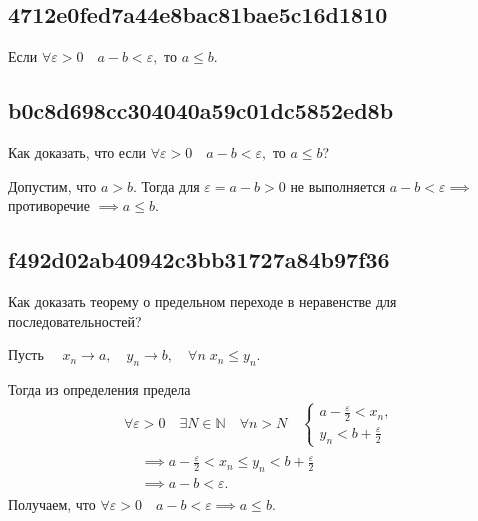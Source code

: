 \documentclass[11pt, a5paper]{article}
\newenvironment{note}[1]{\goodbreak\par\subsection{\hfill \color{lightgray}\tiny #1}}{}
\newenvironment{cloze}[2][\ldots]{\begin{leftbar}}{\end{leftbar}}
\newenvironment{icloze}[2][\ldots]{%
  \ignorespaces\text{\tiny \color{lightgray} \{\{c#2:: }%
}{%
  \text{\tiny \color{lightgray}\}\}}\unskip%
}
\begin{document}
    \begin{note}{4712e0fed7a44e8bac81bae5c16d1810}
        Если \( \forall \varepsilon > 0 \quad a - b < \varepsilon, \) то
        \begin{icloze}{1}\( a \leqslant b. \)\end{icloze}
    \end{note}

    \begin{note}{b0c8d698cc304040a59c01dc5852ed8b}
        Как доказать, что если \( \forall \varepsilon > 0 \quad a - b <
        \varepsilon, \) то \( a \leqslant b \)?

        \begin{cloze}{1}
            Допустим, что \( a > b. \) Тогда для \( \varepsilon = a - b > 0 \)
            не выполняется \( a - b < \varepsilon \implies  \) противоречие \(
            \implies a \leqslant b. \)
        \end{cloze}
    \end{note}

    \begin{note}{f492d02ab40942c3bb31727a84b97f36}
        Как доказать теорему о предельном переходе в неравенстве для
        последовательностей?

        \begin{cloze}{1}
            Пусть \( \quad x_n \to a, \quad y_n \to b, \quad \forall n\; x_n
            \leqslant y_n. \)

            Тогда из определения предела \[
                \begin{gathered}
                    \forall \varepsilon > 0 \quad \exists N \in \mathbb N \quad
                    \forall n > N \quad \begin{cases}
                        a - \frac{\varepsilon}{2} < x_n, \\
                        y_n < b + \frac{\varepsilon}{2}
                    \end{cases} \\
                    \begin{aligned}
                        &\implies a - \frac{\varepsilon}{2} < x_n \leqslant y_n < b + \frac{\varepsilon}{2} \\
                        &\implies a - b < \varepsilon.
                    \end{aligned}
                \end{gathered}
            \]
            Получаем, что \( \forall \varepsilon > 0 \quad a - b < \varepsilon
            \implies a \leqslant b. \)
        \end{cloze}
    \end{note}
\end{document}
